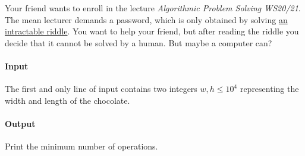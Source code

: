 




Your friend wants to enroll in the lecture \emph{Algorithmic Problem Solving WS20/21}.
The mean lecturer demands a password, which is only obtained by solving \href{https://hpi.de/friedrich/teaching/ws20/algoriddles.html}{an intractable riddle}.
You want to help your friend, but after reading the riddle you decide that it cannot be solved by a human.
But maybe a computer can?

\paragraph*{Input}

The first and only line of input contains two integers $w,h\leq10^4$ representing the width and length of the chocolate.

\paragraph*{Output}

Print the minimum number of operations.

\begin{samples}
\end{samples}


